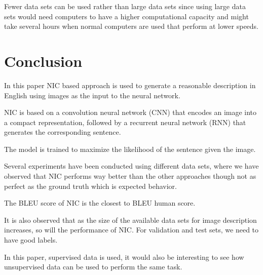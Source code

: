 \documentclass[a4paper,UKenglish,cleveref, autoref, thm-restate]{lipics-v2021}
\begin{document}
Fewer data sets can be used rather than large data sets since using large data sets would need computers to have a higher computational capacity and might take several hours when normal computers are used that perform at lower speeds.


\section{Conclusion}
\label{conclusion}
In this paper NIC based approach is used to generate a reasonable description in English using images as the input to the neural network.

NIC is based on a convolution neural network (CNN) that encodes an image into a compact representation, followed by a recurrent neural network (RNN) that generates the corresponding sentence.

The model is trained to maximize the likelihood of the sentence given the image.

Several experiments have been conducted using different data sets, where we have observed that NIC performs way better than the other approaches though not as perfect as the ground truth which is expected behavior.

The BLEU score of NIC is the closest to BLEU human score.

It is also observed that as the size of the available data sets for image description increases, so will the performance of NIC. For validation and test sets, we need to have good labels.

In this paper, supervised data is used, it would also be interesting to see how unsupervised data can be used to perform the same task.



 












\appendix
\end{document}
